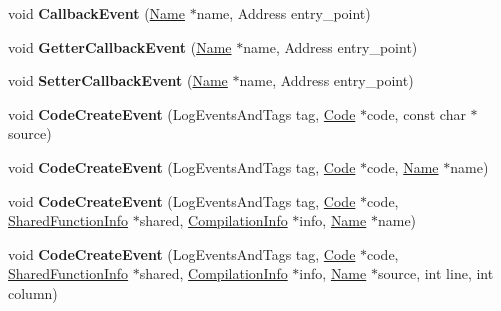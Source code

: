 \begin{DoxyCompactItemize}
\item 
\hypertarget{classv8_1_1internal_1_1_logger_ace8960698b9b890935ccb6630bd192a8}{}void {\bfseries Callback\+Event} (\hyperlink{classv8_1_1internal_1_1_name}{Name} $\ast$name, Address entry\+\_\+point)\label{classv8_1_1internal_1_1_logger_ace8960698b9b890935ccb6630bd192a8}

\item 
\hypertarget{classv8_1_1internal_1_1_logger_a21663c1573fb2e9bfec2e92ecc848c80}{}void {\bfseries Getter\+Callback\+Event} (\hyperlink{classv8_1_1internal_1_1_name}{Name} $\ast$name, Address entry\+\_\+point)\label{classv8_1_1internal_1_1_logger_a21663c1573fb2e9bfec2e92ecc848c80}

\item 
\hypertarget{classv8_1_1internal_1_1_logger_a2f82143fc6ec50da1efed2cc09027a65}{}void {\bfseries Setter\+Callback\+Event} (\hyperlink{classv8_1_1internal_1_1_name}{Name} $\ast$name, Address entry\+\_\+point)\label{classv8_1_1internal_1_1_logger_a2f82143fc6ec50da1efed2cc09027a65}

\item 
\hypertarget{classv8_1_1internal_1_1_logger_a8cc7a4edd8bf192f295b5f3afed8fe72}{}void {\bfseries Code\+Create\+Event} (Log\+Events\+And\+Tags tag, \hyperlink{classv8_1_1internal_1_1_code}{Code} $\ast$code, const char $\ast$source)\label{classv8_1_1internal_1_1_logger_a8cc7a4edd8bf192f295b5f3afed8fe72}

\item 
\hypertarget{classv8_1_1internal_1_1_logger_a0751d1b139f68db1330833db21f794d4}{}void {\bfseries Code\+Create\+Event} (Log\+Events\+And\+Tags tag, \hyperlink{classv8_1_1internal_1_1_code}{Code} $\ast$code, \hyperlink{classv8_1_1internal_1_1_name}{Name} $\ast$name)\label{classv8_1_1internal_1_1_logger_a0751d1b139f68db1330833db21f794d4}

\item 
\hypertarget{classv8_1_1internal_1_1_logger_a20f22513605e37e85bfff3655fe2b0a8}{}void {\bfseries Code\+Create\+Event} (Log\+Events\+And\+Tags tag, \hyperlink{classv8_1_1internal_1_1_code}{Code} $\ast$code, \hyperlink{classv8_1_1internal_1_1_shared_function_info}{Shared\+Function\+Info} $\ast$shared, \hyperlink{classv8_1_1internal_1_1_compilation_info}{Compilation\+Info} $\ast$info, \hyperlink{classv8_1_1internal_1_1_name}{Name} $\ast$name)\label{classv8_1_1internal_1_1_logger_a20f22513605e37e85bfff3655fe2b0a8}

\item 
\hypertarget{classv8_1_1internal_1_1_logger_aa36c37b9d13145375d2e8103abd7a129}{}void {\bfseries Code\+Create\+Event} (Log\+Events\+And\+Tags tag, \hyperlink{classv8_1_1internal_1_1_code}{Code} $\ast$code, \hyperlink{classv8_1_1internal_1_1_shared_function_info}{Shared\+Function\+Info} $\ast$shared, \hyperlink{classv8_1_1internal_1_1_compilation_info}{Compilation\+Info} $\ast$info, \hyperlink{classv8_1_1internal_1_1_name}{Name} $\ast$source, int line, int column)\label{classv8_1_1internal_1_1_logger_aa36c37b9d13145375d2e8103abd7a129}


\end{DoxyCompactItemize}
